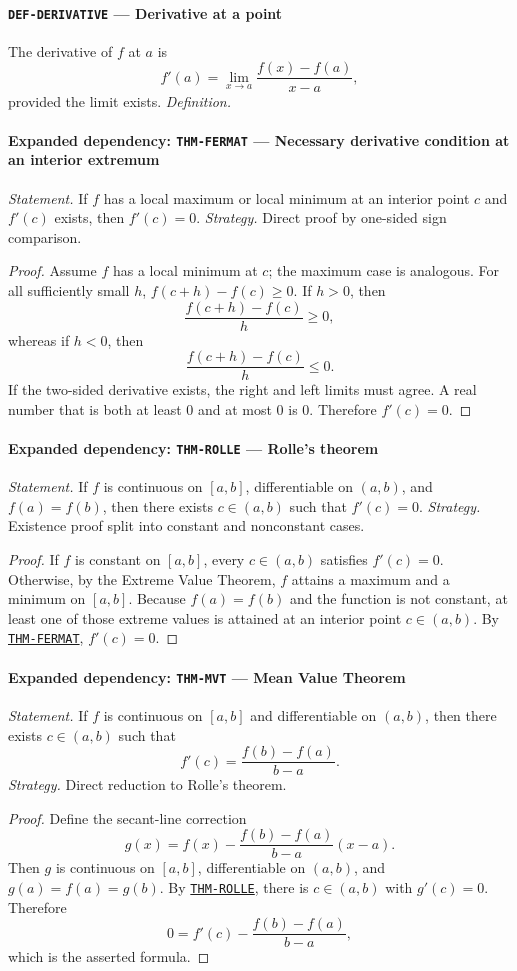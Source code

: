 \documentclass[10pt]{article}
\newcommand{\pidraw}[1]{\begingroup\urlstyle{tt}\nolinkurl{#1}\endgroup}
\newcommand{\pidref}[1]{\hyperref[prf:#1]{\pidraw{#1}}}
\newcommand{\pid}[1]{\pidref{#1}}
\theoremstyle{definition}
\theoremstyle{remark}
\begin{document}
\paragraph{\pidraw{DEF-DERIVATIVE} --- Derivative at a point}
The derivative of $f$ at $a$ is
\[
f'(a)=\lim_{x\to a}\frac{f(x)-f(a)}{x-a},
\]
provided the limit exists.
\textit{Definition.}

\paragraph{Expanded dependency: \pidraw{THM-FERMAT} --- Necessary derivative condition at an interior extremum}
\textit{Statement.} If $f$ has a local maximum or local minimum at an interior point $c$ and $f'(c)$ exists, then $f'(c)=0$.
\textit{Strategy.} Direct proof by one-sided sign comparison.
\begin{proof}Assume $f$ has a local minimum at $c$; the maximum case is analogous.
For all sufficiently small $h$,
$f(c+h)-f(c)\ge0$. If $h>0$, then
\[
\frac{f(c+h)-f(c)}{h}\ge0,
\]
whereas if $h<0$, then
\[
\frac{f(c+h)-f(c)}{h}\le0.
\]
If the two-sided derivative exists, the right and left limits must agree.
A real number that is both at least $0$ and at most $0$ is $0$.
Therefore $f'(c)=0$.\end{proof}

\paragraph{Expanded dependency: \pidraw{THM-ROLLE} --- Rolle's theorem}
\textit{Statement.} If $f$ is continuous on $[a,b]$, differentiable on $(a,b)$, and $f(a)=f(b)$, then there exists $c\in(a,b)$ such that $f'(c)=0$.
\textit{Strategy.} Existence proof split into constant and nonconstant cases.
\begin{proof}If $f$ is constant on $[a,b]$, every $c\in(a,b)$ satisfies $f'(c)=0$.
Otherwise, by the Extreme Value Theorem, $f$ attains a maximum and a minimum
on $[a,b]$. Because $f(a)=f(b)$ and the function is not constant, at least one
of those extreme values is attained at an interior point $c\in(a,b)$.
By \pid{THM-FERMAT}, $f'(c)=0$.\end{proof}

\paragraph{Expanded dependency: \pidraw{THM-MVT} --- Mean Value Theorem}
\textit{Statement.} If $f$ is continuous on $[a,b]$ and differentiable on $(a,b)$, then there exists $c\in(a,b)$ such that
\[
f'(c)=\frac{f(b)-f(a)}{b-a}.
\]
\textit{Strategy.} Direct reduction to Rolle's theorem.
\begin{proof}Define the secant-line correction
\[
g(x)=f(x)-\frac{f(b)-f(a)}{b-a}(x-a).
\]
Then $g$ is continuous on $[a,b]$, differentiable on $(a,b)$, and
$g(a)=f(a)=g(b)$. By \pid{THM-ROLLE}, there is $c\in(a,b)$ with $g'(c)=0$.
Therefore
\[
0=f'(c)-\frac{f(b)-f(a)}{b-a},
\]
which is the asserted formula.\end{proof}
\end{document}
